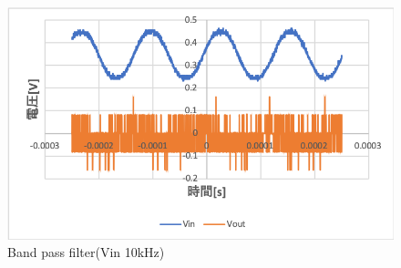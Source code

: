 \documentclass[11pt, a4paper,twocolumn]{jarticle}
\begin{document}
\begin{figure}[htbp]
 \begin{center}
  \includegraphics[width=0.8\linewidth]{fig55.png}
 \end{center}
 \caption{Band pass filter(Vin 10kHz)}
 \label{fig:55}
\end{figure}

\newpage




\newpage
\end{document}
